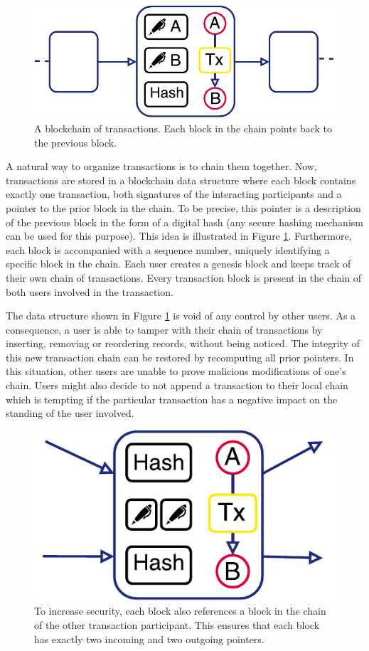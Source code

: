 \documentclass[USenglish]{article}
\begin{document}
\begin{figure}[h!]
	\centering
	\includegraphics[width=0.7\columnwidth]{assets/trustchain_tutorial_2}
	\caption{A blockchain of transactions. Each block in the chain points back to the previous block.}
	\label{fig:trustchain_tutorial_2}
\end{figure}

A natural way to organize transactions is to chain them together.
Now, transactions are stored in a blockchain data structure where each block contains exactly one transaction, both signatures of the interacting participants and a pointer to the prior block in the chain.
To be precise, this pointer is a description of the previous block in the form of a digital hash (any secure hashing mechanism can be used for this purpose).
This idea is illustrated in Figure \ref{fig:trustchain_tutorial_2}.
Furthermore, each block is accompanied with a sequence number, uniquely identifying a specific block in the chain.
Each user creates a genesis block and keeps track of their own chain of transactions.
Every transaction block is present in the chain of both users involved in the transaction.

The data structure shown in Figure \ref{fig:trustchain_tutorial_2} is void of any control by other users. As a consequence, a user is able to tamper with their chain of transactions by inserting, removing or reordering records, without being noticed.
The integrity of this new transaction chain can be restored by recomputing all prior pointers.
In this situation, other users are unable to prove malicious modifications of one's chain.
Users might also decide to not append a transaction to their local chain which is tempting if the particular transaction has a negative impact on the standing of the user involved.

\begin{figure}[h!]
	\centering
	\includegraphics[width=0.5\columnwidth]{assets/trustchain_tutorial_3}
	\caption{To increase security, each block also references a block in the chain of the other transaction participant. This ensures that each block has exactly two incoming and two outgoing pointers.}
	\label{fig:trustchain_tutorial_3}
\end{figure}
\end{document}
